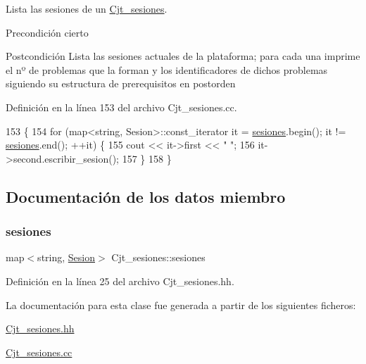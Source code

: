 Lista las sesiones de un \mbox{\hyperlink{class_cjt__sesiones}{Cjt\+\_\+sesiones}}. 

\begin{DoxyPrecond}{Precondición}
cierto 
\end{DoxyPrecond}
\begin{DoxyPostcond}{Postcondición}
Lista las sesiones actuales de la plataforma; para cada una imprime el nº de problemas que la forman y los identificadores de dichos problemas siguiendo su estructura de prerequisitos en postorden 
\end{DoxyPostcond}


Definición en la línea 153 del archivo Cjt\+\_\+sesiones.\+cc.


\begin{DoxyCode}
153                                              \{
154       \textcolor{keywordflow}{for} (map<string, Sesion>::const\_iterator it = \mbox{\hyperlink{class_cjt__sesiones_a87e835a62e561eeb0f93eedbdcbe1802}{sesiones}}.begin(); it != 
      \mbox{\hyperlink{class_cjt__sesiones_a87e835a62e561eeb0f93eedbdcbe1802}{sesiones}}.end(); ++it) \{
155         cout << it->first << \textcolor{stringliteral}{" "};
156         it->second.escribir\_sesion();
157       \}
158     \}
\end{DoxyCode}


\subsection{Documentación de los datos miembro}
\mbox{\label{class_cjt__sesiones_a87e835a62e561eeb0f93eedbdcbe1802}} 
\subsubsection{\texorpdfstring{sesiones}{sesiones}}
{\footnotesize\ttfamily map$<$string, \mbox{\hyperlink{class_sesion}{Sesion}}$>$ Cjt\+\_\+sesiones\+::sesiones\hspace{0.3cm}{\ttfamily [private]}}



Definición en la línea 25 del archivo Cjt\+\_\+sesiones.\+hh.



La documentación para esta clase fue generada a partir de los siguientes ficheros\+:\begin{DoxyCompactItemize}
\item 
\mbox{\hyperlink{_cjt__sesiones_8hh}{Cjt\+\_\+sesiones.\+hh}}\item 
\mbox{\hyperlink{_cjt__sesiones_8cc}{Cjt\+\_\+sesiones.\+cc}}\end{DoxyCompactItemize}
